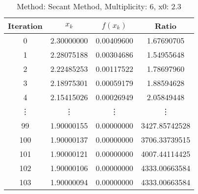 \begin{table}
\centering
\caption{Method: Secant Method, Multiplicity: 6, x0: 2.3}
\label{tab:table_Secant_Method_6_2_3}
\begin{tabular}{c c c c}
\toprule
Iteration &      $x_k$ &   $f(x_k)$ &         Ratio \\
\midrule
        0 & 2.30000000 & 0.00409600 &    1.67690705 \\
        1 & 2.28075188 & 0.00304686 &    1.54955648 \\
        2 & 2.22485253 & 0.00117522 &    1.78697960 \\
        3 & 2.18975301 & 0.00059179 &    1.88594628 \\
        4 & 2.15415026 & 0.00026949 &    2.05849448 \\
   \vdots &     \vdots &     \vdots &        \vdots \\
       99 & 1.90000155 & 0.00000000 & 3427.85742528 \\
      100 & 1.90000137 & 0.00000000 & 3706.33739515 \\
      101 & 1.90000121 & 0.00000000 & 4007.44114425 \\
      102 & 1.90000106 & 0.00000000 & 4333.00663584 \\
      103 & 1.90000094 & 0.00000000 & 4333.00663584 \\
\bottomrule
\end{tabular}
\end{table}
